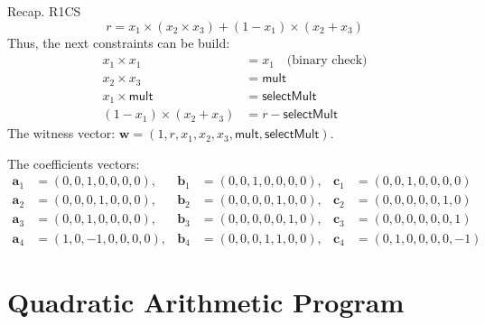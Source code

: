\documentclass{zkdl-presentation-template}
\begin{document}
    \begin{frame}{Recap. R1CS}
        \vspace{-10pt}
        \begin{equation*}
            r = x_1 \times (x_2 \times x_3) + (1 - x_1) \times (x_2 + x_3)
        \end{equation*}
        \pause
        Thus, the next constraints can be build:
        \vspace{-5pt}
        \begin{align*}
            x_1 \times x_1 &= x_1 \quad \text{(binary check)} \tag{1} \\
            x_2 \times x_3 &= \mathsf{mult} \tag{2} \\
            x_1 \times \mathsf{mult} &= \mathsf{selectMult} \tag{3} \\
            (1 - x_1) \times (x_2 + x_3) &= r - \mathsf{selectMult} \tag{4}
        \end{align*}
        \pause
        The witness vector: $\mathbf{w} = (1, r, x_1, x_2, x_3, \mathsf{mult}, \mathsf{selectMult})$.
        
        \pause
        \vspace{2pt}
        The coefficients vectors:
        \vspace{-25pt}
        {\center\small\begin{align*}
            \mathbf{a}_1 &= (0, 0, 1, 0, 0, 0, 0), & \mathbf{b}_1 &= (0, 0, 1, 0, 0, 0, 0), & \mathbf{c}_1 &= (0, 0, 1, 0, 0, 0, 0) \\
            \mathbf{a}_2 &= (0, 0, 0, 1, 0, 0, 0), & \mathbf{b}_2 &= (0, 0, 0, 0, 1, 0, 0), & \mathbf{c}_2 &= (0, 0, 0, 0, 0, 1, 0) \\
            \mathbf{a}_3 &= (0, 0, 1, 0, 0, 0, 0), & \mathbf{b}_3 &= (0, 0, 0, 0, 0, 1, 0), & \mathbf{c}_3 &= (0, 0, 0, 0, 0, 0, 1) \\
            \mathbf{a}_4 &= (1, 0, -1, 0, 0, 0, 0), & \mathbf{b}_4 &= (0, 0, 0, 1, 1, 0, 0), & \mathbf{c}_4 &= (0, 1, 0, 0, 0, 0, -1)
        \end{align*}}
    \end{frame}
    
    \section{Quadratic Arithmetic Program}
\end{document}
